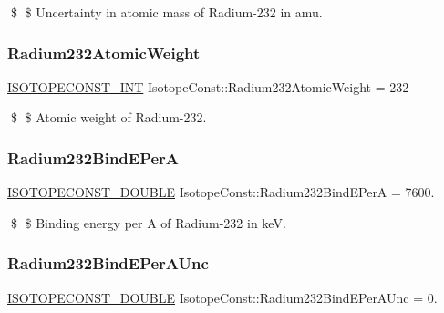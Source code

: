 \$ \$ Uncertainty in atomic mass of Radium-\/232 in amu. \mbox{\label{group___isotope_const-_radium-_ra232_gaeffd8f9a07a1bf6c618002d2f75a4439}} 
\subsubsection{\texorpdfstring{Radium232\+Atomic\+Weight}{Radium232AtomicWeight}}
{\footnotesize\ttfamily \mbox{\hyperlink{group___isotope_const-_macros_ga5f18360b3e99483a35c32d789e62621c}{I\+S\+O\+T\+O\+P\+E\+C\+O\+N\+S\+T\+\_\+\+I\+NT}} Isotope\+Const\+::\+Radium232\+Atomic\+Weight = 232}

\$ \$ Atomic weight of Radium-\/232. \mbox{\label{group___isotope_const-_radium-_ra232_ga4d51fd1e640858da815de3cf02c364c0}} 
\subsubsection{\texorpdfstring{Radium232\+Bind\+E\+PerA}{Radium232BindEPerA}}
{\footnotesize\ttfamily \mbox{\hyperlink{group___isotope_const-_macros_ga8f45a7272ce02c0b4c65c44636ed719a}{I\+S\+O\+T\+O\+P\+E\+C\+O\+N\+S\+T\+\_\+\+D\+O\+U\+B\+LE}} Isotope\+Const\+::\+Radium232\+Bind\+E\+PerA = 7600.}

\$ \$ Binding energy per A of Radium-\/232 in keV. \mbox{\label{group___isotope_const-_radium-_ra232_gad4dc6be01a39c224acbf0ebbe66c7246}} 
\subsubsection{\texorpdfstring{Radium232\+Bind\+E\+Per\+A\+Unc}{Radium232BindEPerAUnc}}
{\footnotesize\ttfamily \mbox{\hyperlink{group___isotope_const-_macros_ga8f45a7272ce02c0b4c65c44636ed719a}{I\+S\+O\+T\+O\+P\+E\+C\+O\+N\+S\+T\+\_\+\+D\+O\+U\+B\+LE}} Isotope\+Const\+::\+Radium232\+Bind\+E\+Per\+A\+Unc = 0.}

